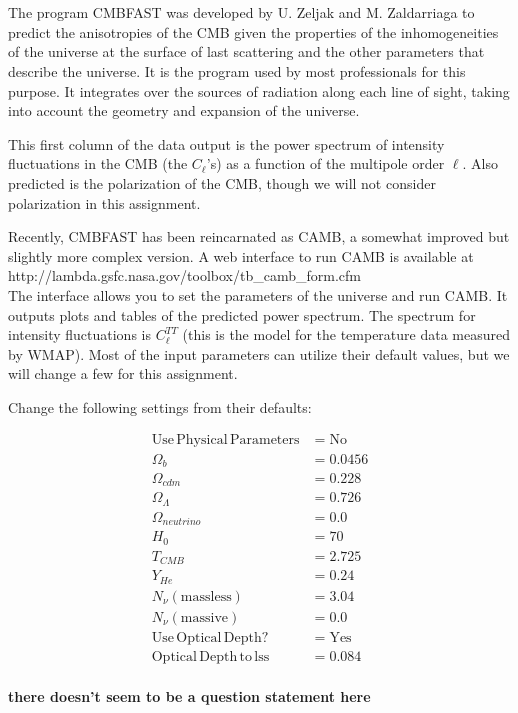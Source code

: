 \documentclass[12pt]{article}
\begin{document}
\section{}

The program CMBFAST was developed by U. Zeljak and M. Zaldarriaga to predict the anisotropies of the CMB given the properties of the inhomogeneities of the universe at the surface of last scattering and the other parameters that describe the universe. It is the program used by most professionals for this purpose. It integrates over the sources of radiation along each line of sight, taking into account the geometry and expansion of the universe.

This first column of the data output is the power spectrum of intensity fluctuations in the CMB (the \(C_\ell\)'s) as a function of the multipole order \(\ell\). Also predicted is the polarization of the CMB, though we will not consider polarization in this assignment.

Recently, CMBFAST has been reincarnated as CAMB, a somewhat improved but slightly more complex version. A web interface to run CAMB is available at \\

http://lambda.gsfc.nasa.gov/toolbox/tb\_camb\_form.cfm \\

The interface allows you to set the parameters of the universe and run CAMB. It outputs plots and tables of the predicted power spectrum. The spectrum for intensity fluctuations is \(C_\ell^{TT}\) (this is the model for the temperature data measured by WMAP). Most of the input parameters can utilize their default values, but we will change a few for this assignment.

Change the following settings from their defaults:

\begin{align*}
\mathrm{Use\,Physical\,Parameters} &= \mathrm{No} \\
\Omega_b &= 0.0456 \\
\Omega_{cdm} &= 0.228 \\
\Omega_\Lambda &= 0.726 \\
\Omega_{neutrino} &= 0.0 \\
H_0 &= 70 \\
T_{CMB} &= 2.725 \\
Y_{He}&=0.24 \\
N_\nu \mathrm{(massless)} &= 3.04 \\
N_\nu  \mathrm{(massive)} &= 0.0 \\
\mathrm{Use\,Optical\,Depth?} &= \mathrm{Yes} \\
\mathrm{Optical\,Depth\,to\,lss} &= 0.084 \\
\end{align*}

\textbf{there doesn't seem to be a question statement here}
\end{document}
